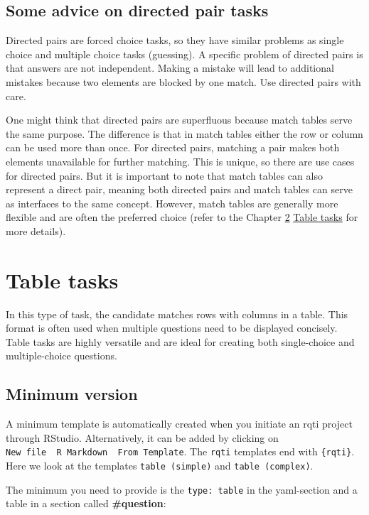\documentclass[twoside]{tufte-book}
\begin{document}
\section{Some advice on directed pair tasks}\label{some-advice-on-directed-pair-tasks}

Directed pairs are forced choice tasks, so they have similar problems as single choice and multiple choice tasks (guessing). A specific problem of directed pairs is that answers are not independent. Making a mistake will lead to additional mistakes because two elements are blocked by one match. Use directed pairs with care.

One might think that directed pairs are superfluous because match tables serve the same purpose. The difference is that in match tables either the row or column can be used more than once. For directed pairs, matching a pair makes both elements unavailable for further matching. This is unique, so there are use cases for directed pairs. But it is important to note that match tables can also represent a direct pair, meaning both directed pairs and match tables can serve as interfaces to the same concept. However, match tables are generally more flexible and are often the preferred choice (refer to the Chapter \ref{table-tasks} \href{table.html}{Table tasks} for more details).

\chapter{Table tasks}\label{table-tasks}

In this type of task, the candidate matches rows with columns in a table. This format is often used when multiple questions need to be displayed concisely. Table tasks are highly versatile and are ideal for creating both single-choice and multiple-choice questions.

\section{Minimum version}\label{minimum-version-7}

A minimum template is automatically created when you initiate an rqti project through RStudio. Alternatively, it can be added by clicking on \texttt{New\ file\ \textrightarrow{}\ R\ Markdown\ \textrightarrow{}\ From\ Template}. The \texttt{rqti} templates end with \texttt{\{rqti\}}. Here we look at the templates \texttt{table\ (simple)} and \texttt{table\ (complex)}.

The minimum you need to provide is the \texttt{type:\ table} in the yaml-section and a table in a section called \textbf{\#question}:
\end{document}
